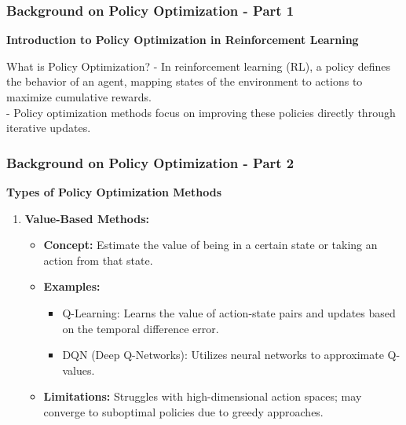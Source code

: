 \documentclass{beamer}
\begin{document}
\begin{frame}[fragile]
    \frametitle{Background on Policy Optimization - Part 1}
    \textbf{Introduction to Policy Optimization in Reinforcement Learning}
    
    \begin{block}{What is Policy Optimization?}
        - In reinforcement learning (RL), a policy defines the behavior of an agent, mapping states of the environment to actions to maximize cumulative rewards.\\
        - Policy optimization methods focus on improving these policies directly through iterative updates.
    \end{block}
\end{frame}

\begin{frame}[fragile]
    \frametitle{Background on Policy Optimization - Part 2}
    \textbf{Types of Policy Optimization Methods}
    
    \begin{enumerate}
        \item \textbf{Value-Based Methods:}
            \begin{itemize}
                \item \textbf{Concept:} Estimate the value of being in a certain state or taking an action from that state.
                \item \textbf{Examples:}
                    \begin{itemize}
                        \item Q-Learning: Learns the value of action-state pairs and updates based on the temporal difference error.
                        \item DQN (Deep Q-Networks): Utilizes neural networks to approximate Q-values.
                    \end{itemize}
                \item \textbf{Limitations:} Struggles with high-dimensional action spaces; may converge to suboptimal policies due to greedy approaches.
            \end{itemize}
        

\end{enumerate}
\end{frame}
\end{document}
